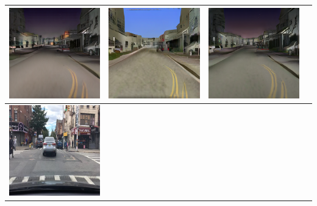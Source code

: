 \documentclass{VUMIFPSbakalaurinis}
\begin{document}
\begin{table}[H]
{\begin{tabular}{|c|c|c|c|}
            \includegraphics[scale=0.35]{img/pvz/3_cycle_v2} & \includegraphics[scale=0.35]{img/pvz/3_cut_v2} & \includegraphics[scale=0.35]{img/pvz/3_mspc_v2}
            \\
            \hline
            \includegraphics[scale=0.35]{img/pvz/4_real} & 

\end{tabular}}
\end{table}
\end{document}

